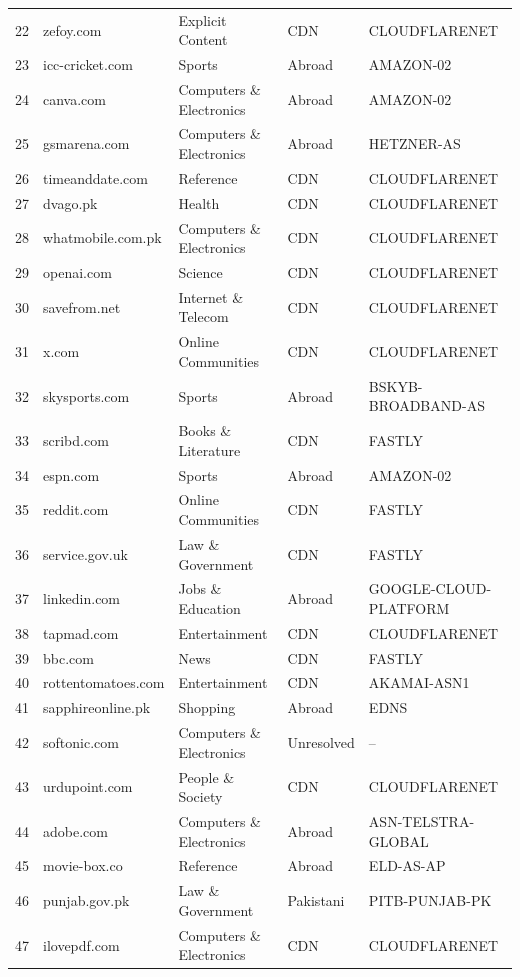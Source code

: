 \documentclass{article}
\begin{document}
\begin{longtable}{r l l l l}
22 & zefoy.com & Explicit Content & CDN & CLOUDFLARENET \\
23 & icc-cricket.com & Sports & Abroad & AMAZON-02 \\
24 & canva.com & Computers \& Electronics & Abroad & AMAZON-02 \\
25 & gsmarena.com & Computers \& Electronics & Abroad & HETZNER-AS \\
26 & timeanddate.com & Reference & CDN & CLOUDFLARENET \\
27 & dvago.pk & Health & CDN & CLOUDFLARENET \\
28 & whatmobile.com.pk & Computers \& Electronics & CDN & CLOUDFLARENET \\
29 & openai.com & Science & CDN & CLOUDFLARENET \\
30 & savefrom.net & Internet \& Telecom & CDN & CLOUDFLARENET \\
31 & x.com & Online Communities & CDN & CLOUDFLARENET \\
32 & skysports.com & Sports & Abroad & BSKYB-BROADBAND-AS \\
33 & scribd.com & Books \& Literature & CDN & FASTLY \\
34 & espn.com & Sports & Abroad & AMAZON-02 \\
35 & reddit.com & Online Communities & CDN & FASTLY \\
36 & service.gov.uk & Law \& Government & CDN & FASTLY \\
37 & linkedin.com & Jobs \& Education & Abroad & GOOGLE-CLOUD-PLATFORM \\
38 & tapmad.com & Entertainment & CDN & CLOUDFLARENET \\
39 & bbc.com & News & CDN & FASTLY \\
40 & rottentomatoes.com & Entertainment & CDN & AKAMAI-ASN1 \\
41 & sapphireonline.pk & Shopping & Abroad & EDNS \\
42 & softonic.com & Computers \& Electronics & Unresolved & -- \\
43 & urdupoint.com & People \& Society & CDN & CLOUDFLARENET \\
44 & adobe.com & Computers \& Electronics & Abroad & ASN-TELSTRA-GLOBAL \\
45 & movie-box.co & Reference & Abroad & ELD-AS-AP \\
46 & punjab.gov.pk & Law \& Government & Pakistani & PITB-PUNJAB-PK \\
47 & ilovepdf.com & Computers \& Electronics & CDN & CLOUDFLARENET \\

\end{longtable}
\end{document}
